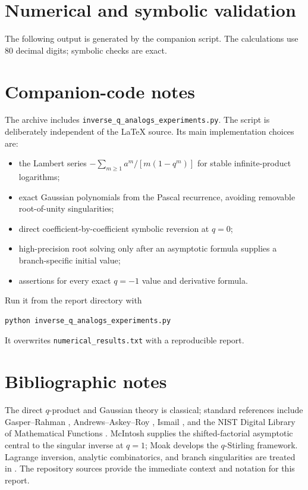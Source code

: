 \documentclass[11pt,oneside]{book}
\theoremstyle{definition}
\theoremstyle{remark}
\begin{document}
\chapter{Numerical and symbolic validation}\label{app:numerical-results}
The following output is generated by the companion script.  The calculations
use 80 decimal digits; symbolic checks are exact.


\chapter{Companion-code notes}
The archive includes \texttt{inverse\_q\_analogs\_experiments.py}.  The script
is deliberately independent of the LaTeX source.  Its main implementation
choices are:
\begin{itemize}
\item the Lambert series
$-\sum_{m\ge1}a^m/[m(1-q^m)]$ for stable infinite-product logarithms;
\item exact Gaussian polynomials from the Pascal recurrence, avoiding
      removable root-of-unity singularities;
\item direct coefficient-by-coefficient symbolic reversion at $q=0$;
\item high-precision root solving only after an asymptotic formula supplies a
      branch-specific initial value;
\item assertions for every exact $q=-1$ value and derivative formula.
\end{itemize}
Run it from the report directory with
\begin{verbatim}
python inverse_q_analogs_experiments.py
\end{verbatim}
It overwrites \texttt{numerical\_results.txt} with a reproducible report.

\chapter{Bibliographic notes}
The direct $q$-product and Gaussian theory is classical; standard references
include Gasper--Rahman \cite{GasperRahman}, Andrews--Askey--Roy
\cite{AndrewsAskeyRoy}, Ismail \cite{Ismail}, and the NIST Digital Library of
Mathematical Functions \cite{DLMFq}.  McIntosh \cite{McIntosh1999} supplies
the shifted-factorial asymptotic central to the singular inverse at $q=1$;
Moak \cite{Moak1984} develops the $q$-Stirling framework.  Lagrange inversion,
analytic combinatorics, and branch singularities are treated in
\cite{Comtet,FlajoletSedgewick,Henrici}.  The repository sources
\cite{ProveItFrontiers,ProveItMonograph} provide the immediate context and
notation for this report.
\end{document}
